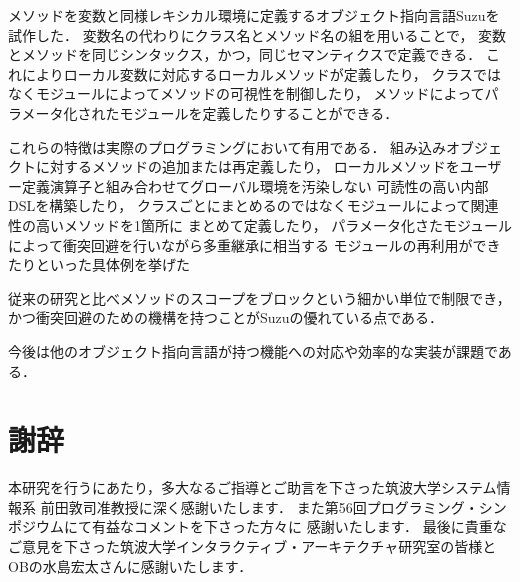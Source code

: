 \documentclass[a4paper,11pt,dvipdfmx]{jreport}
\makeatletter
\renewenvironment{thebibliography}[1]%
{\chapter*{\bibname\@mkboth{\bibname}{\bibname}}%
	\addcontentsline{toc}{chapter}{\numberline{}\bibname}%
	\list{\@biblabel{\@arabic\c@enumiv}}%
	{\settowidth\labelwidth{\@biblabel{#1}}%
		\leftmargin\labelwidth
		\advance\leftmargin\labelsep
		\@openbib@code
		\usecounter{enumiv}%
		\let\p@enumiv\@empty
		\renewcommand\theenumiv{\@arabic\c@enumiv}}%
	\sloppy
	\clubpenalty4000
	\@clubpenalty\clubpenalty
	\widowpenalty4000%
	\sfcode`\.\@m}
{\def\@noitemerr
	{\@latex@warning{Empty `thebibliography' environment}}%
	\endlist}
\makeatother
\begin{document}
メソッドを変数と同様レキシカル環境に定義するオブジェクト指向言語Suzuを試作した．
変数名の代わりにクラス名とメソッド名の組を用いることで，
変数とメソッドを同じシンタックス，かつ，同じセマンティクスで定義できる．
これによりローカル変数に対応するローカルメソッドが定義したり，
クラスではなくモジュールによってメソッドの可視性を制御したり，
メソッドによってパラメータ化されたモジュールを定義したりすることができる．

これらの特徴は実際のプログラミングにおいて有用である．
組み込みオブジェクトに対するメソッドの追加または再定義したり，
ローカルメソッドをユーザー定義演算子と組み合わせてグローバル環境を汚染しない
可読性の高い内部DSLを構築したり，
クラスごとにまとめるのではなくモジュールによって関連性の高いメソッドを1箇所に
まとめて定義したり，
パラメータ化さたモジュールによって衝突回避を行いながら多重継承に相当する
モジュールの再利用ができたりといった具体例を挙げた

従来の研究と比べメソッドのスコープをブロックという細かい単位で制限でき，
かつ衝突回避のための機構を持つことがSuzuの優れている点である．

今後は他のオブジェクト指向言語が持つ機能への対応や効率的な実装が課題である．


\chapter*{謝辞}

本研究を行うにあたり，多大なるご指導とご助言を下さった筑波大学システム情報系
前田敦司准教授に深く感謝いたします．
また第56回プログラミング・シンポジウムにて有益なコメントを下さった方々に
感謝いたします．
最後に貴重なご意見を下さった筑波大学インタラクティブ・アーキテクチャ研究室の皆様と
OBの水島宏太さんに感謝いたします．

\newpage

\nocite{ContextJ}
\nocite{C3Linearization}
\nocite{CISCO}
\nocite{OptimizingMessageSends}
\nocite{MethodCachingForRuby}
\nocite{ShiftResetTutorial}
\nocite{ShiftResetOnMinCaml}
\nocite{ExnAndDelimCont}
\renewcommand{\bibname}{参考文献}




%
%
\end{document}
